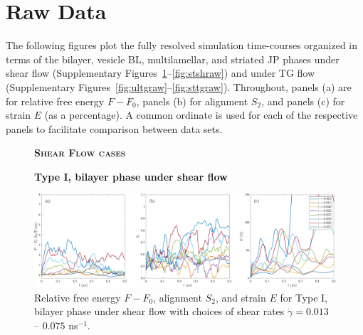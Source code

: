 \section{Raw Data}
The following figures plot the fully resolved simulation time-courses
organized in terms of the bilayer, vesicle BL, multilamellar, and striated JP phases
under shear flow (Supplementary Figures~\ref{fig:ulshraw}--\ref{fig:stshraw})
and under TG flow (Supplementary Figures~\ref{fig:ultgraw}--\ref{fig:sttgraw}).
Throughout, panels (a) are for relative free energy $F - F_0$,
panels (b) for alignment $S_2$, and panels (c) for strain $E$ (as a percentage). 
A common ordinate is used for each of the respective panels to facilitate
comparison between data sets. 
\newpage

\begin{figure}[h!]
\begin{center}
\textbf{\textsc{Shear Flow cases}}\par\medskip
\textbf{Type I, bilayer phase under shear flow}\par\medskip
\includegraphics[width=\textwidth]{SMFigures/ULShRaw.pdf}
\end{center}
\caption{
Relative free energy $F - F_0$,
alignment $S_2$, and strain $E$ for
Type I, bilayer phase under shear flow with choices of shear rates $\dot\gamma=0.013$ -- $0.075$ ns$^{-1}$.
}
\label{fig:ulshraw}
\end{figure}



